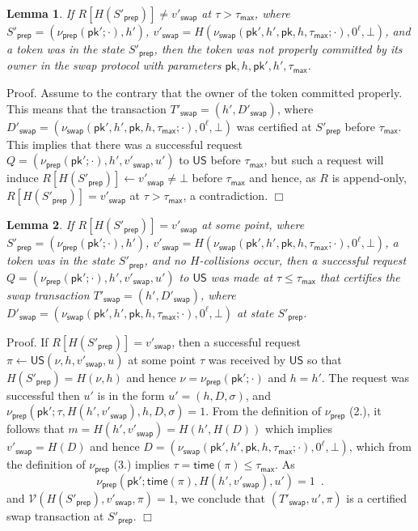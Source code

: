 \documentclass{article}
\newtheorem{lemma}{Lemma}[section]
\newenvironment{proof}{\textsf{Proof}.}{\hfill$\Box$}
\newcommand{\pubkey}[0]{\mathsf{pk}}
\newcommand{\unisrv}[0]{\mathsf{US}}
\newcommand{\univer}[0]{\mathcal{V}}
\begin{document}
\begin{lemma}\label{le:atomic-rollback}
If $R[H(S'_\mathsf{prep})]\neq v'_\mathsf{swap}$ at $\tau>\tau_\mathsf{max}$, where $S'_\mathsf{prep}=(\nu_\mathsf{prep}(\pubkey';\cdot),h')$,  $v'_\mathsf{swap}=H(\nu_\mathsf{swap}(\pubkey',h',\pubkey,h,\tau_\mathsf{max};\cdot),0^\ell,\bot)$, and a token was in the state $S'_\mathsf{prep}$,
then the token was not properly committed
by its owner in the swap protocol with parameters
$\pubkey,h,\pubkey',h',\tau_\mathsf{max}$.\end{lemma}
\begin{proof}
Assume to the contrary that the owner of the token committed properly. This means that the transaction $T'_\mathsf{swap}=(h',D'_\mathsf{swap})$, where $D'_\mathsf{swap}=(\nu_\mathsf{swap}(\pubkey',h',\pubkey,h,\tau_\mathsf{max};\cdot),0^\ell,\bot)$ was certified at $S'_\mathsf{prep}$ before $\tau_\mathsf{max}$. This implies that there was a successful request $Q=(\nu_\mathsf{prep}(\pubkey';\cdot),h',v'_\mathsf{swap},u')$
to $\unisrv$ before $\tau_\mathsf{max}$,
but such a request will induce $R[H(S'_\mathsf{prep})]\gets v'_\mathsf{swap}\neq\bot$ before $\tau_\mathsf{max}$ and hence, as $R$ is append-only,
$R[H(S'_\mathsf{prep})]= v'_\mathsf{swap}$
at $\tau>\tau_\mathsf{max}$, a contradiction.
\end{proof}


\begin{lemma}\label{le:atomic-success}
If $R[H(S'_\mathsf{prep})]= v'_\mathsf{swap}$ at some point, where $S'_\mathsf{prep}=(\nu_\mathsf{prep}(\pubkey';\cdot),h')$,  $v'_\mathsf{swap}=H(\nu_\mathsf{swap}(\pubkey',h',\pubkey,h,\tau_\mathsf{max};\cdot),0^\ell,\bot)$, a token was in the state $S'_\mathsf{prep}$, and no $H$-collisions occur, then a successful request $Q=(\nu_\mathsf{prep}(\pubkey';\cdot),h',v'_\mathsf{swap},u')$
to $\unisrv$ was made at $\tau\le\tau_\mathsf{max}$ that
certifies the swap transaction $T'_\mathsf{swap}=(h',D'_\mathsf{swap})$, where $D'_\mathsf{swap}=(\nu_\mathsf{swap}(\pubkey',h',\pubkey,h,\tau_\mathsf{max};\cdot),0^\ell,\bot)$ at state $S'_\mathsf{prep}$.
\end{lemma}
\begin{proof}
If $R[H(S'_\mathsf{prep})]=v'_\mathsf{swap}$, then a successful request $\pi\gets \unisrv(\nu,h,v'_\mathsf{swap},u)$ at some point $\tau$ was received by $\unisrv$ so that $H(S'_\mathsf{prep})=H(\nu,h)$ and hence $\nu=\nu_\mathsf{prep}(\pubkey';\cdot)$ and $h=h'$. The request was successful then $u'$ is in the form $u'=(h,D,\sigma)$, and $\nu_\mathsf{prep}(\pubkey';\tau,H(h',v'_\mathsf{swap}),h,D,\sigma)=1$. From the definition of $\nu_\mathsf{prep}$ (2.), it follows that $m=H(h',v'_\mathsf{swap})=H(h',H(D))$ which implies $v'_\mathsf{swap}=H(D)$ and hence $D=(\nu_\mathsf{swap}(\pubkey',h',\pubkey,h,\tau_\mathsf{max};\cdot),0^\ell,\bot)$, which from the definition of $\nu_\mathsf{prep}$ (3.) implies
$\tau=\mathsf{time}(\pi)\le\tau_\mathsf{max}$.
As
\[
\nu_\mathsf{prep}(\pubkey';\mathsf{time}(\pi), H(h',v'_\mathsf{swap}), u') = 1\enspace.
\]
and $\univer(H(S'_\mathsf{prep}),v'_\mathsf{swap},\pi)=1$, we conclude that $(T'_\mathsf{swap},u',\pi)$ is a certified swap transaction at $S'_\mathsf{prep}$.
\end{proof}\medskip
\end{document}
